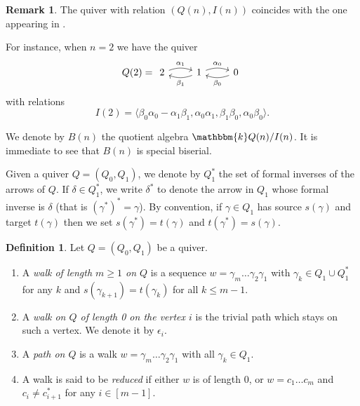 \documentclass[11pt]{amsart}
\theoremstyle{definition}
\newtheorem{definition}[theorem]{Definition}
\newtheorem{remark}[theorem]{Remark}
\newcommand{\kk}{\mathbbm{k}}
\begin{document}
\begin{remark}
  The quiver with relation $(Q(n), I(n))$ coincides with the one appearing in \cite[Example 1.1.]{stroppelTQFT}. 
\end{remark}

For instance, when $n=2$ we have the quiver
\begin{equation}\label{equation:quiver_Q}
 Q(2)=\begin{tikzcd}
    2 \ar[r,bend left=20,"\alpha_1"]& 1\ar[r,bend left=20,"\alpha_0"]\ar[l,bend left=20,"\beta_1"] & 0 \ar[l,bend left=20,"\beta_0"]
\end{tikzcd}
\end{equation}
with relations
\begin{equation}\label{equation:relations_I}
    I(2)=\langle \beta_0\alpha_0-\alpha_1 \beta_1, \alpha_0\alpha_1,\beta_1\beta_0, \alpha_0\beta_0 \rangle.
\end{equation}


We denote by $B(n)$ the quotient algebra $\kk Q(n)/I(n)$. It is immediate to see that $B(n)$ is special biserial.

Given a quiver $Q=(Q_0,Q_1)$, we denote by $Q_1^*$ the set of formal inverses of the arrows of $Q$. If $\delta\in Q_1^*$, we write $\delta^*$ to denote the arrow in $Q_1$  whose formal inverse is $\delta$ (that is $(\gamma^*)^*=\gamma$). By convention, if $\gamma\in Q_1$ has source $s(\gamma)$ and target $t(\gamma)$ then we set $s(\gamma^*)=t(\gamma)$ and $t(\gamma^*)=s(\gamma)$.

\begin{definition} Let $Q=(Q_0, Q_1)$ be a quiver.
    \begin{enumerate}
        \item A \emph{walk of length $m\geq 1$ on $Q$} is a  sequence $w=\gamma_m\ldots\gamma_2\gamma_1$ with $\gamma_k\in Q_1\cup Q_1^*$ for any $k$ and $s(\gamma_{k+1})=t(\gamma_k)$ for all $k\leq m-1$.
        \item A \emph{walk on $Q$ of length 0 on the vertex $i$} is the trivial path which stays on such a vertex. We denote it by $\epsilon_i$.
        \item A \emph{path on $Q$} is a walk $w=\gamma_m\ldots\gamma_2\gamma_1$ with all $\gamma_k\in Q_1$.
        \item A walk is said to be \emph{reduced} if either $w$ is of length 0, or $w=c_1\ldots c_m$ and $c_i\neq c_{i+1}^*$ for any $i\in [m-1]$. 
    \end{enumerate}
\end{definition}
\end{document}
